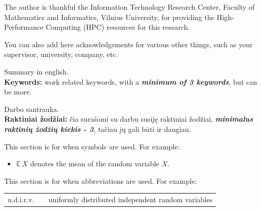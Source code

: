 \documentclass[]{VUMIFTemplateClass}
\newcommand{\EE}{\mathbb{E}\,} %
\begin{document}

\onehalfspacing


The author is thankful the Information Technology Research Center, Faculty of Mathematics and Informatics, Vilnius University, for providing the High-Performance Computing (HPC) resources for this research.

You can also add here acknowledgements for various other things, such as your supervisor, university, company, etc.


Summary in english.\\

\textbf{Keywords:} work related keywords, with a \textit{\textbf{minimum of 3 keywords}}, but can be more.


Darbo santrauka.\\

\textbf{Raktiniai žodžiai:} čia surašomi su darbu susiję raktiniai žodžiai, \textit{\textbf{minimalus raktinių žodžių kiekis - 3}}, tačiau jų gali būti ir daugiau.




\singlespacing
{}
\listoffigures 

\listoftables

\tableofcontents
\onehalfspacing


This section is for when symbols are used. For example:
\begin{itemize}
    \item $\EE X$ denotes the mean of the random variable $X$.
\end{itemize}


This section is for when abbreviations are used. For example:

\begin{tabular}{rcp{}}
    {u.d.i.r.v.} & {} & {uniformly distributed independent random variables}
\end{tabular}
\end{document}
